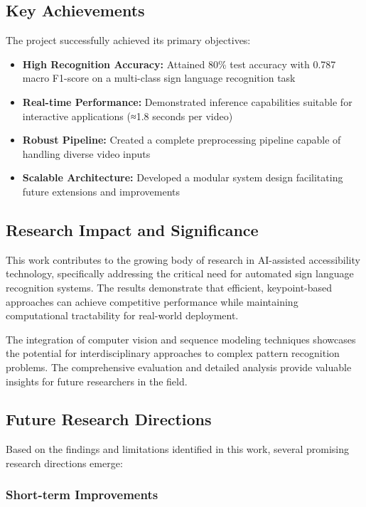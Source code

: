 \documentclass[11pt, a4paper]{article}
\begin{document}
\subsection{Key Achievements}

The project successfully achieved its primary objectives:

\begin{itemize}
    \item \textbf{High Recognition Accuracy:} Attained 80\% test accuracy with 0.787 macro F1-score on a multi-class sign language recognition task
    \item \textbf{Real-time Performance:} Demonstrated inference capabilities suitable for interactive applications (≈1.8 seconds per video)
    \item \textbf{Robust Pipeline:} Created a complete preprocessing pipeline capable of handling diverse video inputs
    \item \textbf{Scalable Architecture:} Developed a modular system design facilitating future extensions and improvements
\end{itemize}

\subsection{Research Impact and Significance}

This work contributes to the growing body of research in AI-assisted accessibility technology, specifically addressing the critical need for automated sign language recognition systems. The results demonstrate that efficient, keypoint-based approaches can achieve competitive performance while maintaining computational tractability for real-world deployment.

The integration of computer vision and sequence modeling techniques showcases the potential for interdisciplinary approaches to complex pattern recognition problems. The comprehensive evaluation and detailed analysis provide valuable insights for future researchers in the field.

\subsection{Future Research Directions}

Based on the findings and limitations identified in this work, several promising research directions emerge:

\subsubsection{Short-term Improvements}
\end{document}

